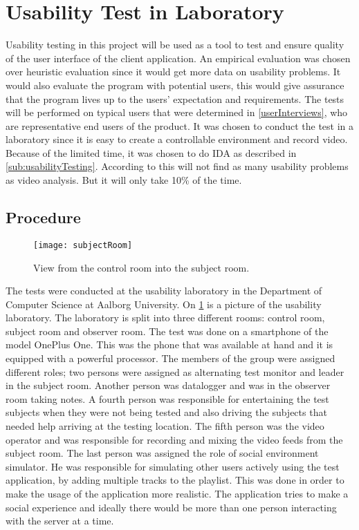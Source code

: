 \section{Usability Test in Laboratory}
Usability testing in this project will be used as a tool to test and
ensure quality of the user interface of the client application. An empirical evaluation was chosen over heuristic evaluation since it would get more data on usability problems. It would also evaluate the program with potential users, this would give assurance that the program lives up to the users' expectation and requirements. The tests will be performed on
typical users that were determined in \cref{userInterviews}, who are
representative end users of the product. It was chosen to conduct the
test in a laboratory since it is easy to create a controllable
environment and record video. Because of the limited time, it was
chosen to do IDA as described in \cref{sub:usabilityTesting}. According to \cite{kjeldskov2004instant} this will not find as many usability problems as video analysis. But it will only take 10\% of the time.

\subsection{Procedure}
\begin{figure}
  \centering
  \texttt{[image: subjectRoom]}
  \caption{View from the control room into the subject room.}
  \label{fig:subjectRoom}
\end{figure}

The tests were conducted at the usability laboratory in the Department of Computer Science at Aalborg University. On \cref{fig:subjectRoom} is a picture of the usability laboratory. The laboratory is split into three different rooms: control room, subject room and observer room. The test was done on a smartphone of the model OnePlus One. This was
the phone that was available at hand and it is equipped with a powerful
processor. The members of the group were assigned different roles; two
persons were assigned as alternating test monitor and
leader in the subject room. Another person was datalogger and was in
the observer room taking notes. A fourth person was responsible for entertaining the test
subjects when they were not being tested and also driving the subjects
that needed help arriving at the testing location. The fifth person
was the video operator and was responsible for recording and mixing
the video feeds from the subject room. The last person was assigned the role of social environment simulator. He was responsible for simulating other users actively using the test application, by adding multiple tracks to the playlist. This was done in order to make the usage of the application more realistic. The application tries to make a social experience and ideally there would be more than one person interacting with the server at a time.

